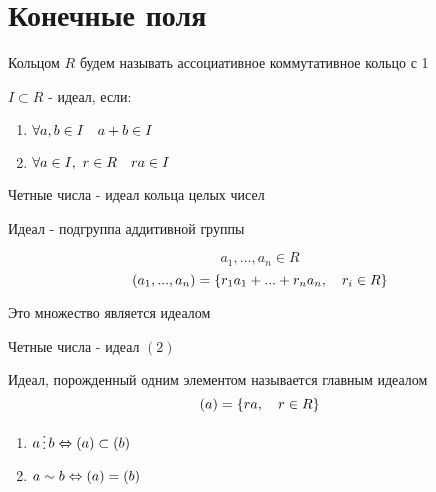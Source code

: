 \documentclass[main.tex]{subfiles}
\begin{document}
    \section{Конечные поля}
    Кольцом $R$ будем называть ассоциативное коммутативное кольцо с 1
    \begin{definition}
        $I \subset R$ - идеал, если:
        \begin{enumerate}
          \item $\forall a,b \in I \quad a + b \in I$
          \item $\forall a \in I,\ r \in R \quad ra \in I$
        \end{enumerate}
    \end{definition}

    \begin{example}
        Четные числа - идеал кольца целых чисел
    \end{example}

    \begin{remark}

        Идеал - подгруппа аддитивной группы
    \end{remark}

    \begin{Definition}[конструкция]
        \[a_1,..., a_n \in R\]
        \[(a_1,...,a_n) = \{ r_1 a_1 + ... + r_n a_n,\quad r_i \in R\} \]
    \end{Definition}

    \begin{utv}
        Это множество является идеалом
    \end{utv}

    \begin{example}
        Четные числа - идеал $(2)$
    \end{example}

    \begin{definition}
        Идеал, порожденный одним элементом называется главным идеалом
        \[(a) = \{ ra,\quad r \in R\}\]
    \end{definition}

    \begin{properties}
        \begin{enumerate}
          \item $a \devides b \lra (a) \subset (b)$
          \item $a \sim b \Leftrightarrow (a) = (b)$
        \end{enumerate}
    \end{properties}
\end{document}
